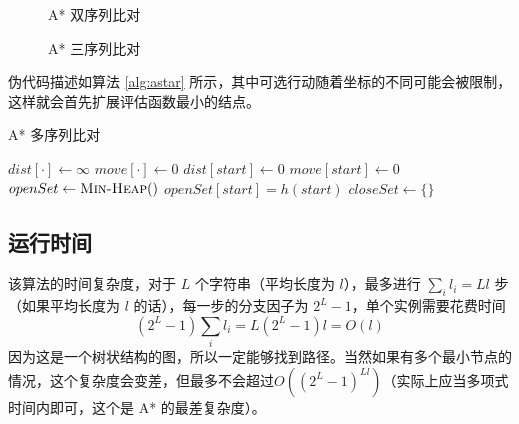     \begin{figure}[h]
        \centering
        \begin{minipage}{0.48\textwidth}
            \centering
            
            \caption{A* 双序列比对}\label{fig:pairwiseastar}
        \end{minipage}
        \begin{minipage}{0.48\textwidth}
            \centering
            
            \caption{A* 三序列比对}\label{fig:multipleastar}
        \end{minipage}
    \end{figure}

    伪代码描述如算法 \ref{alg:astar} 所示\cite{astarwiki}，其中可选行动随着坐标的不同可能会被限制，这样就会首先扩展评估函数最小的结点。

    \begin{algorithm}[h]
        \caption{A* 多序列比对}\label{alg:astar}
        \BlankLine
        $dist[\cdot]\leftarrow\infty$\;
        $move[\cdot]\leftarrow 0$\;
        $dist[start]\leftarrow 0$\;
        $move[start]\leftarrow 0$\;
        $openSet\leftarrow\textsc{Min-Heap}()$\;
        $openSet[start]=h(start)$\;
        $closeSet\leftarrow \{\}$\;
        \Return{$\infty$}\;
    \end{algorithm}


    \subsection{运行时间}

    该算法的时间复杂度，对于 $L$ 个字符串（平均长度为 $l$），最多进行 $\sum_i l_i=Ll$ 步（如果平均长度为 $l$ 的话），每一步的分支因子为 $2^{L}-1$，单个实例需要花费时间
    \begin{equation*}
        (2^L-1)\sum_i l_i = L(2^L-1)l = O(l)
    \end{equation*}
    因为这是一个树状结构的图，所以一定能够找到路径。当然如果有多个最小节点的情况，这个复杂度会变差，但最多不会超过$O((2^L-1)^{Ll})$（实际上应当多项式时间内即可，这个是 A* 的最差复杂度）。

